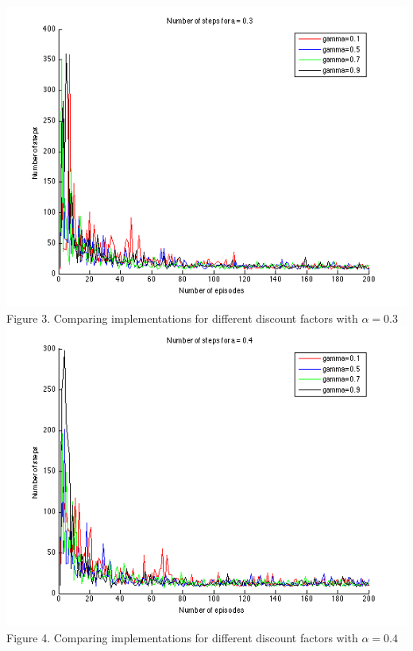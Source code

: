 \documentclass[a4paper,11pt]{article}
\begin{document}
\begin{center}
\includegraphics[width=1.0\textwidth,height=0.4\textheight]{a3.png}
\label{Figure 3}
Figure 3. 	Comparing implementations for different discount factors with $\alpha = 0.3$\vspace{1cm}
\centering
\includegraphics[width=1.0\textwidth,height=0.4\textheight]{a4.png}
\label{Figure 4}
Figure 4. 	Comparing implementations for different discount factors with $\alpha = 0.4$\vspace{1cm}
\end{center}
\end{document}
